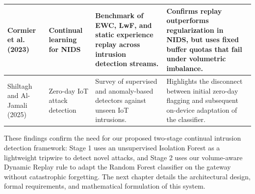 \begin{table}[htpb]
\begin{tabular}{|p{2.6cm}|p{2.6cm}|p{4.2cm}|p{4.6cm}|}
Cormier et al. (2023)~\cite{replay_or_regret2023} & Continual learning for NIDS & Benchmark of EWC, LwF, and static experience replay across intrusion detection streams. & Confirms replay outperforms regularization in NIDS, but uses fixed buffer quotas that fail under volumetric imbalance. \\ \hline
Shiltagh and Al-Jamali (2025)~\cite{shiltagh2025zeroday} & Zero-day IoT attack detection & Survey of supervised and anomaly-based detectors against unseen IoT intrusions. & Highlights the disconnect between initial zero-day flagging and subsequent on-device adaptation of the classifier. \\ \hline
\end{tabular}
\end{table}

These findings confirm the need for our proposed two-stage continual intrusion detection framework: Stage 1 uses an unsupervised Isolation Forest as a lightweight tripwire to detect novel attacks, and Stage 2 uses our volume-aware Dynamic Replay rule to adapt the Random Forest classifier on the gateway without catastrophic forgetting. The next chapter details the architectural design, formal requirements, and mathematical formulation of this system.
